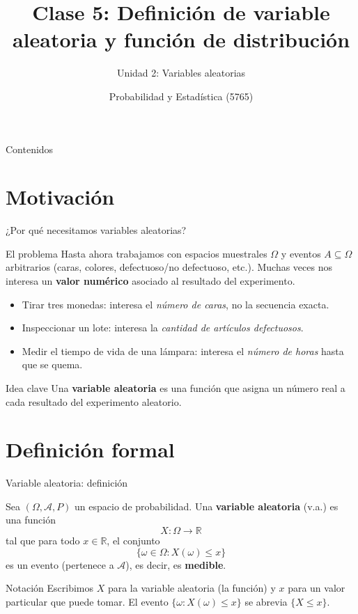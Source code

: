 \documentclass[aspectratio=169,11pt]{beamer}
\title[Prob. y Estadística]{Clase 5: Definición de variable aleatoria y función de distribución}
\subtitle{Unidad 2: Variables aleatorias}
\institute[UNS]{Universidad Nacional del Sur \\ Departamento de Matemática}
\author{Probabilidad y Estadística (5765)}
\date{}
\begin{document}
\begin{frame}
\titlepage
\end{frame}

\begin{frame}{Contenidos}
\tableofcontents
\end{frame}

\section{Motivación}

\begin{frame}{¿Por qué necesitamos variables aleatorias?}
\begin{block}{El problema}
Hasta ahora trabajamos con espacios muestrales $\Omega$ y eventos $A \subseteq \Omega$ arbitrarios (caras, colores, defectuoso/no defectuoso, etc.). Muchas veces nos interesa un \textbf{valor numérico} asociado al resultado del experimento.
\end{block}

\begin{example}
\begin{itemize}
\item Tirar tres monedas: interesa el \emph{número de caras}, no la secuencia exacta.
\item Inspeccionar un lote: interesa la \emph{cantidad de artículos defectuosos}.
\item Medir el tiempo de vida de una lámpara: interesa el \emph{número de horas} hasta que se quema.
\end{itemize}
\end{example}

\begin{alertblock}{Idea clave}
Una \textbf{variable aleatoria} es una función que asigna un número real a cada resultado del experimento aleatorio.
\end{alertblock}
\end{frame}

\section{Definición formal}

\begin{frame}{Variable aleatoria: definición}
\begin{definition}
Sea $(\Omega, \mathcal{A}, P)$ un espacio de probabilidad. Una \textbf{variable aleatoria} (v.a.) es una función
$$X : \Omega \longrightarrow \mathbb{R}$$
tal que para todo $x \in \mathbb{R}$, el conjunto
$$\{\omega \in \Omega : X(\omega) \le x\}$$
es un evento (pertenece a $\mathcal{A}$), es decir, es \textbf{medible}.
\end{definition}

\begin{alertblock}{Notación}
Escribimos $X$ para la variable aleatoria (la función) y $x$ para un valor particular que puede tomar. El evento $\{\omega : X(\omega) \le x\}$ se abrevia $\{X \le x\}$.
\end{alertblock}
\end{frame}
\end{document}
